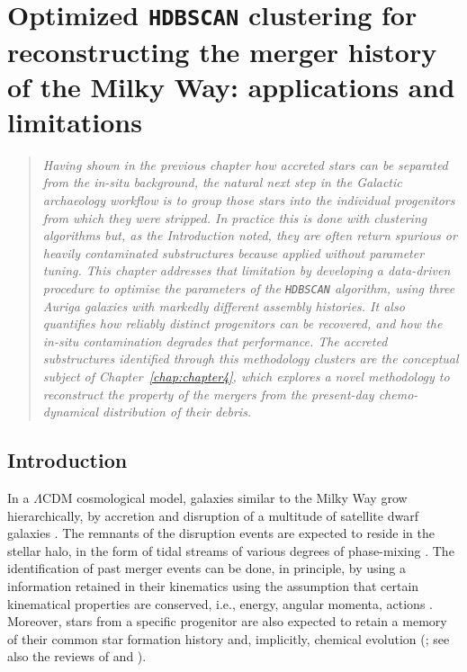 ﻿%
\graphicspath{{Chapter_3_paper_folder/}}

\chapter{Optimized \texttt{HDBSCAN} clustering for reconstructing the merger history 
of the Milky Way: applications and limitations}
\label{chap:chapter3}

\begin{quote}
\itshape
Having shown in the previous chapter how accreted stars can be separated from the in-situ background,
the natural next step in the Galactic archaeology workflow is to group those stars into the individual progenitors from which they were stripped.
In practice this is done with clustering algorithms but, as the Introduction noted, they are often return spurious or
heavily contaminated substructures because applied without parameter tuning.
This chapter addresses that limitation by developing a data-driven procedure to optimise the parameters
of the \texttt{HDBSCAN} algorithm, using three Auriga galaxies with markedly different assembly histories.
It also quantifies how reliably distinct progenitors can be recovered,
and how the in-situ contamination degrades that performance.
The accreted substructures identified through this methodology clusters are
the conceptual subject of Chapter~\ref{chap:chapter4}, which explores
a novel methodology to reconstruct the property of the mergers from the
present-day chemo-dynamical distribution of their debris.
\end{quote}

\section{Introduction}

In a $\Lambda$CDM cosmological model, galaxies similar to the Milky Way grow hierarchically, by accretion and disruption of a multitude of satellite dwarf galaxies \citep{Searle1978,White1978}. The remnants of the disruption events are expected to reside in the stellar halo, in the form of tidal streams of various degrees of phase-mixing \citep{Helmi2020}. The identification of past merger events can be done, in principle, by using a information retained in their kinematics using the assumption that certain kinematical properties are conserved, i.e., energy, angular momenta, actions \citep{Helmi1999b,Helmi2000,Knebe2005,Font2006a,Morrison2009,Gomez2010}. Moreover, stars from a specific progenitor are also expected to retain a memory of their common star formation history and, implicitly, chemical evolution (\citealt{Freeman2002}; see also the reviews of \citealt{BlandHawthorn2016} and \citealt{Deason2024}). 

